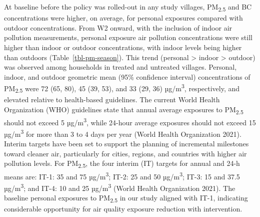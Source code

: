\documentclass[
  letterpaper,
  DIV=11,
  numbers=noendperiod]{scrartcl}
\begin{document}
At baseline before the policy was rolled-out in any study villages,
PM\textsubscript{2.5} and BC concentrations were higher, on average, for
personal exposures compared with outdoor concentrations. From W2 onward,
with the inclusion of indoor air pollution measurements, personal
exposure air pollution concentrations were still higher than indoor or
outdoor concentrations, with indoor levels being higher than outdoors
(Table~\ref{tbl-pm-season}). This trend (personal \textgreater{} indoor
\textgreater{} outdoor) was observed among households in treated and
untreated villages. Personal, indoor, and outdoor geometric mean (95\%
confidence interval) concentrations of PM\textsubscript{2.5} were 72
(65, 80), 45 (39, 53), and 33 (29, 36) µg/m\textsuperscript{3},
respectively, and elevated relative to health-based guidelines. The
current World Health Organization (WHO) guidelines state that annual
average exposures to PM\textsubscript{2.5} should not exceed 5
µg/m\textsuperscript{3}, while 24-hour average exposures should not
exceed 15 µg/m\textsuperscript{3} for more than 3 to 4 days per year
(World Health Organization 2021). Interim targets have been set to
support the planning of incremental milestones toward cleaner air,
particularly for cities, regions, and countries with higher air
pollution levels. For PM\textsubscript{2.5}, the four interim (IT)
targets for annual and 24-h means are: IT-1: 35 and 75
µg/m\textsuperscript{3}; IT-2: 25 and 50 µg/m\textsuperscript{3}; IT-3:
15 and 37.5 µg/m\textsuperscript{3}; and IT-4: 10 and 25
µg/m\textsuperscript{3} (World Health Organization 2021). The baseline
personal exposures to PM\textsubscript{2.5} in our study aligned with
IT-1, indicating considerable opportunity for air quality exposure
reduction with intervention.
\end{document}
